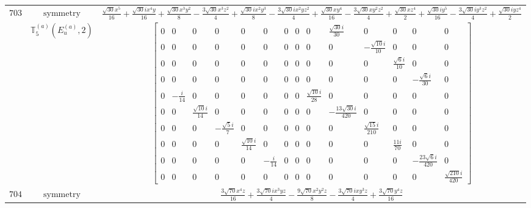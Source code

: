 \documentclass[fleqn,8pt,landscape]{jsarticle}
\begin{document}
\begin{longtable}{ccc}
$ 703 $ & $ \text{symmetry} $ & $ \frac{\sqrt{30} x^{5}}{16} + \frac{\sqrt{30} i x^{4} y}{16} + \frac{\sqrt{30} x^{3} y^{2}}{8} - \frac{3 \sqrt{30} x^{3} z^{2}}{4} + \frac{\sqrt{30} i x^{2} y^{3}}{8} - \frac{3 \sqrt{30} i x^{2} y z^{2}}{4} + \frac{\sqrt{30} x y^{4}}{16} - \frac{3 \sqrt{30} x y^{2} z^{2}}{4} + \frac{\sqrt{30} x z^{4}}{2} + \frac{\sqrt{30} i y^{5}}{16} - \frac{3 \sqrt{30} i y^{3} z^{2}}{4} + \frac{\sqrt{30} i y z^{4}}{2} $ \\
$  $ & $ \mathbb{T}_{5}^{(a)}(E_{u}^{(a)},2) $ & $ \begin{bmatrix} 0 & 0 & 0 & 0 & 0 & 0 & 0 & 0 & 0 & \frac{\sqrt{30} i}{30} & 0 & 0 & 0 & 0 \\ 0 & 0 & 0 & 0 & 0 & 0 & 0 & 0 & 0 & 0 & - \frac{\sqrt{10} i}{10} & 0 & 0 & 0 \\ 0 & 0 & 0 & 0 & 0 & 0 & 0 & 0 & 0 & 0 & 0 & \frac{\sqrt{6} i}{10} & 0 & 0 \\ 0 & 0 & 0 & 0 & 0 & 0 & 0 & 0 & 0 & 0 & 0 & 0 & - \frac{\sqrt{6} i}{30} & 0 \\ 0 & - \frac{i}{14} & 0 & 0 & 0 & 0 & 0 & 0 & \frac{\sqrt{10} i}{28} & 0 & 0 & 0 & 0 & 0 \\ 0 & 0 & \frac{\sqrt{10} i}{14} & 0 & 0 & 0 & 0 & 0 & 0 & - \frac{13 \sqrt{30} i}{420} & 0 & 0 & 0 & 0 \\ 0 & 0 & 0 & - \frac{\sqrt{5} i}{7} & 0 & 0 & 0 & 0 & 0 & 0 & \frac{\sqrt{15} i}{210} & 0 & 0 & 0 \\ 0 & 0 & 0 & 0 & \frac{\sqrt{10} i}{14} & 0 & 0 & 0 & 0 & 0 & 0 & \frac{11 i}{70} & 0 & 0 \\ 0 & 0 & 0 & 0 & 0 & - \frac{i}{14} & 0 & 0 & 0 & 0 & 0 & 0 & - \frac{23 \sqrt{6} i}{420} & 0 \\ 0 & 0 & 0 & 0 & 0 & 0 & 0 & 0 & 0 & 0 & 0 & 0 & 0 & \frac{\sqrt{210} i}{420} \end{bmatrix} $ \\ \hline
$ 704 $ & $ \text{symmetry} $ & $ \frac{3 \sqrt{70} x^{4} z}{16} + \frac{3 \sqrt{70} i x^{3} y z}{4} - \frac{9 \sqrt{70} x^{2} y^{2} z}{8} - \frac{3 \sqrt{70} i x y^{3} z}{4} + \frac{3 \sqrt{70} y^{4} z}{16} $ \\

\end{longtable}
\end{document}
